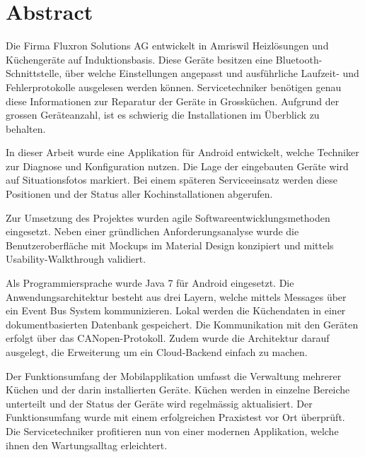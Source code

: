 
\chapter*{Abstract}
Die Firma Fluxron Solutions AG entwickelt in Amriswil Heizlösungen und Küchengeräte auf Induktionsbasis. Diese Geräte besitzen eine Bluetooth-Schnittstelle, über welche Einstellungen angepasst und ausführliche Laufzeit- und Fehlerprotokolle ausgelesen werden können. Servicetechniker benötigen genau diese Informationen zur Reparatur der Geräte in Grossküchen. Aufgrund der grossen Geräteanzahl, ist es schwierig die Installationen im Überblick zu behalten.

In dieser Arbeit wurde eine Applikation für Android entwickelt, welche Techniker zur Diagnose und Konfiguration nutzen. Die Lage der eingebauten Geräte wird auf Situationsfotos markiert. Bei einem späteren Serviceeinsatz werden diese Positionen und der Status aller Kochinstallationen abgerufen.

Zur Umsetzung des Projektes wurden agile Softwareentwicklungsmethoden eingesetzt. Neben einer gründlichen Anforderungsanalyse wurde die Benutzeroberfläche mit Mockups im Material Design konzipiert und mittels Usability-Walkthrough validiert.

Als Programmiersprache wurde Java 7 für Android eingesetzt. Die Anwendungsarchitektur besteht aus drei Layern, welche mittels Messages über ein Event Bus System kommunizieren. Lokal werden die Küchendaten in einer dokumentbasierten Datenbank gespeichert. Die Kommunikation mit den Geräten erfolgt über das CANopen-Protokoll. Zudem wurde die Architektur darauf ausgelegt, die Erweiterung um ein Cloud-Backend einfach zu machen.

Der Funktionsumfang der Mobilapplikation umfasst die Verwaltung mehrerer Küchen und der darin installierten Geräte. Küchen werden in einzelne Bereiche unterteilt und der Status der Geräte wird regelmässig aktualisiert. Der Funktionsumfang wurde mit einem erfolgreichen Praxistest vor Ort überprüft. Die Servicetechniker profitieren nun von einer modernen Applikation, welche ihnen den Wartungsalltag erleichtert.
